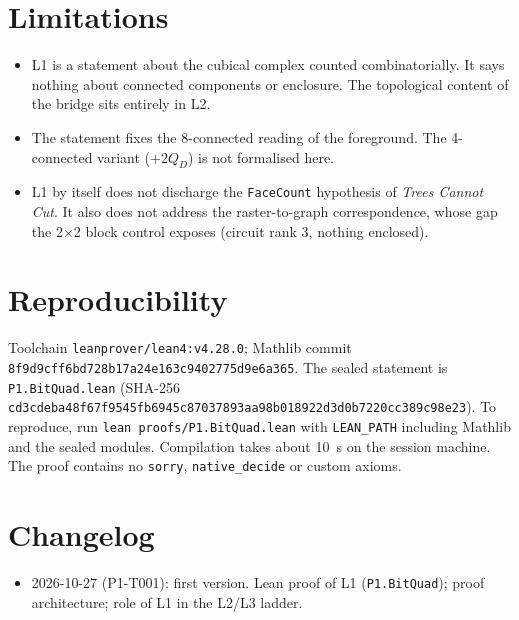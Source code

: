 \documentclass[11pt]{article}
\theoremstyle{definition}
\theoremstyle{remark}
\begin{document}
\section{Limitations}

\begin{itemize}
  \item L1 is a statement about the cubical complex counted combinatorially. It
        says nothing about connected components or enclosure. The topological
        content of the bridge sits entirely in L2.
  \item The statement fixes the 8-connected reading of the foreground. The
        4-connected variant ($+2Q_D$) is not formalised here.
  \item L1 by itself does not discharge the \texttt{FaceCount} hypothesis of
        \emph{Trees Cannot Cut}. It also does not address the raster-to-graph
        correspondence, whose gap the 2$\times$2 block control exposes
        (circuit rank 3, nothing enclosed).
\end{itemize}

\section{Reproducibility}

Toolchain \texttt{leanprover/lean4:v4.28.0}; Mathlib commit
\texttt{8f9d9cff6bd728b17a24e163c9402775d9e6a365}. The sealed statement is
\texttt{P1.BitQuad.lean} (SHA-256 \texttt{cd3cdeba48f67f95\allowbreak45fb6945c87037893aa98b018922d3d0b7220cc389c98e23}).
To reproduce, run
\texttt{lean proofs/P1.BitQuad.lean} with \texttt{LEAN\_PATH} including Mathlib
and the sealed modules. Compilation takes about 10~s on the session machine. The
proof contains no \texttt{sorry}, \texttt{native\_decide} or custom axioms.

\section{Changelog}
\begin{itemize}
  \item 2026-10-27 (P1-T001): first version. Lean proof of L1 (\texttt{P1.BitQuad});
        proof architecture; role of L1 in the L2/L3 ladder.
\end{itemize}



\end{document}
